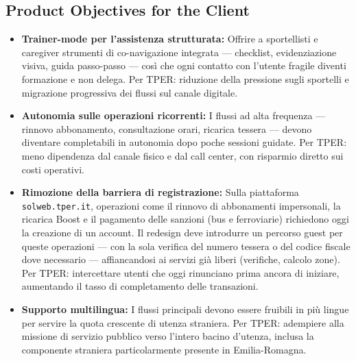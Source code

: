 \documentclass[11pt,a4paper]{article}
\begin{document}
\subsection{Product Objectives for the Client}
\begin{itemize}[leftmargin=*]

    \item \textbf{Trainer-mode per l'assistenza strutturata:}
    Offrire a sportellisti e caregiver strumenti di co-navigazione
    integrata --- checklist, evidenziazione visiva, guida passo-passo ---
    così che ogni contatto con l'utente fragile diventi formazione e
    non delega. Per TPER: riduzione della pressione sugli sportelli e
    migrazione progressiva dei flussi sul canale digitale.

    \item \textbf{Autonomia sulle operazioni ricorrenti:}
    I flussi ad alta frequenza --- rinnovo abbonamento,
    consultazione orari, ricarica tessera --- devono diventare
    completabili in autonomia
    dopo poche sessioni guidate. Per TPER: meno dipendenza dal canale
    fisico e dal call center, con risparmio diretto sui costi operativi.

    \item \textbf{Rimozione della barriera di registrazione:}
    Sulla piattaforma \texttt{solweb.tper.it}, operazioni come il rinnovo
    di abbonamenti impersonali, la ricarica Boost e il pagamento delle
    sanzioni (bus e ferroviarie) richiedono oggi la creazione di un
    account. Il redesign deve introdurre un percorso guest per queste
    operazioni --- con la sola verifica del numero tessera o del codice
    fiscale dove necessario --- affiancandosi ai servizi già liberi
    (verifiche, calcolo zone). Per TPER: intercettare utenti che oggi
    rinunciano prima ancora di iniziare, aumentando il tasso di
    completamento delle transazioni.

    \item \textbf{Supporto multilingua:}
    I flussi principali devono essere fruibili in più lingue per servire
    la quota crescente di utenza straniera. Per TPER: adempiere alla
    missione di servizio pubblico verso l'intero bacino d'utenza,
    inclusa la componente straniera particolarmente presente in
    Emilia-Romagna.

\end{itemize}
\end{document}
